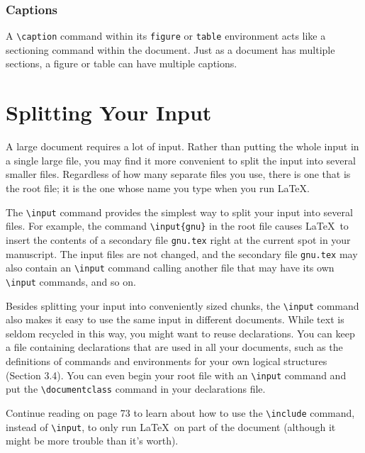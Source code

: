 \documentclass{article}
\newcommand{\justtext}[1]{\texttt{\textbackslash #1}}
\begin{document}
\subsubsection{Captions} 

A \justtext{caption} command within its {\tt figure} or {\tt table} environment acts like a
sectioning command within the document. Just as a document has multiple sections, a figure or table
can have multiple captions.


\section{Splitting Your Input}

A large document requires a lot of input. Rather than putting the whole input in a single large
file, you may find it more convenient to split the input into several smaller files. Regardless of
how many separate files you use, there is one that is the root file; it is the one whose name you
type when you run \LaTeX.

The \justtext{input} command provides the simplest way to split your input into several files. For
example, the command \justtext{input\{gnu\}} in the root file causes \LaTeX\ to insert the contents
of a secondary file {\tt gnu.tex} right at the current spot in your manuscript. The input files are
not changed, and the secondary file {\tt gnu.tex} may also contain an \justtext{input} command
calling another file that may have its own \justtext{input} commands, and so on.

Besides splitting your input into conveniently sized chunks, the \justtext{input} command also makes
it easy to use the same input in different documents. While text is seldom recycled in this way,
you might want to reuse declarations. You can keep a file containing declarations that are used in
all your documents, such as the definitions of commands and environments for your own logical
structures (Section 3.4). You can even begin your root file with an \justtext{input} command and
put the \justtext{documentclass} command in your declarations file.

Continue reading on page 73 to learn about how to use the \justtext{include} command, instead
of \justtext{input}, to only run \LaTeX\ on part of the document (although it might be more trouble
than it's worth).
\end{document}
